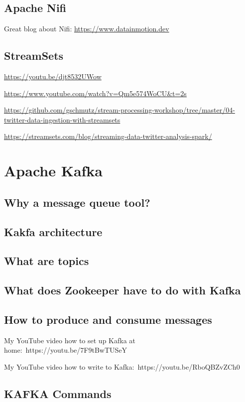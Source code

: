\documentclass[12pt, numbers=noenddot]{scrreprt} %
\begin{document}
\section{Apache Nifi}
Great blog about Nifi:
\url{https://www.datainmotion.dev}

\section{StreamSets}

\url{https://youtu.be/djt8532UWow}

\url{https://www.youtube.com/watch?v=Qm5e574WoCU&t=2s}

\url{https://github.com/gschmutz/stream-processing-workshop/tree/master/04-twitter-data-ingestion-with-streamsets}

\url{https://streamsets.com/blog/streaming-data-twitter-analysis-spark/}

\chapter{Apache Kafka}

\section{Why a message queue tool?}
\section{Kakfa architecture}
\section{What are topics}
\section{What does Zookeeper have to do with Kafka}
\section{How to produce and consume messages}

My YouTube video how to set up Kafka at home: https://youtu.be/7F9tBwTUSeY

My YouTube video how to write to Kafka: https://youtu.be/RboQBZvZCh0

\section{KAFKA Commands}
\end{document}
